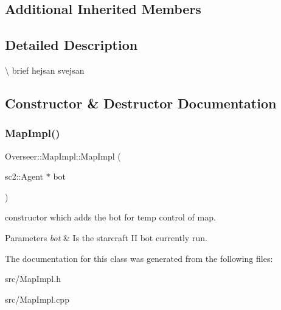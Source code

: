 \subsection*{Additional Inherited Members}


\subsection{Detailed Description}
\textbackslash{} brief hejsan svejsan 

\subsection{Constructor \& Destructor Documentation}
\mbox{\label{classOverseer_1_1MapImpl_a9c30887c6f342971fabd54d23b36a765}} 
\subsubsection{\texorpdfstring{Map\+Impl()}{MapImpl()}}
{\footnotesize\ttfamily Overseer\+::\+Map\+Impl\+::\+Map\+Impl (\begin{DoxyParamCaption}\item[{sc2\+::\+Agent $\ast$}]{bot }\end{DoxyParamCaption})}



constructor which adds the bot for temp control of map. 


\begin{DoxyParams}{Parameters}
{\em bot} & Is the starcraft II bot currently run. \\
\hline
\end{DoxyParams}


The documentation for this class was generated from the following files\+:\begin{DoxyCompactItemize}
\item 
src/Map\+Impl.\+h\item 
src/Map\+Impl.\+cpp\end{DoxyCompactItemize}

